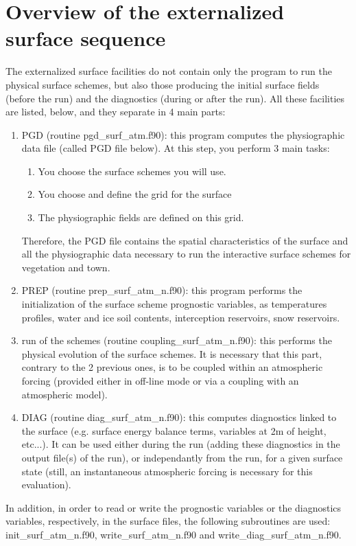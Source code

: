 
\newpage
\section{Overview of the externalized surface sequence}
The externalized surface facilities do not contain only the program to run the physical surface
schemes, but also those producing the initial surface fields (before the run) and the diagnostics
(during or after the run). All these facilities are listed, below, and they separate in 4 main parts:
\begin{enumerate}
	\item PGD (routine pgd\_surf\_atm.f90): this program computes the physiographic data file (called
PGD file below). At this step, you perform 3 main tasks:
		\begin{enumerate}
			\item You choose the surface schemes you will use.
			\item You choose and define the grid for the surface
			\item The physiographic fields are defined on this grid.
		\end{enumerate}
Therefore, the PGD file contains the spatial characteristics of the surface and all the
physiographic data necessary to run the interactive surface schemes for vegetation and
town.
	\item PREP (routine prep\_surf\_atm\_n.f90): this program performs the initialization of the surface
scheme prognostic variables, as temperatures profiles, water and ice soil contents,
interception reservoirs, snow reservoirs.
	\item run of the schemes (routine coupling\_surf\_atm\_n.f90): this performs the physical evolution
of the surface schemes. It is necessary that this part, contrary to the 2 previous ones, is to be
coupled within an atmospheric forcing (provided either in off-line mode or via a coupling
with an atmospheric model).
	\item DIAG (routine diag\_surf\_atm\_n.f90): this computes diagnostics linked to the surface (e.g.
surface energy balance terms, variables at 2m of height, etc...). It can be used either during
the run (adding these diagnostics in the output file(s) of the run), or independantly from the
run, for a given surface state (still, an instantaneous atmospheric forcing is necessary for this
evaluation).
\end{enumerate}
In addition, in order to read or write the prognostic variables or the diagnostics variables,
respectively, in the surface files, the following subroutines are used: init\_surf\_atm\_n.f90,
write\_surf\_atm\_n.f90 and write\_diag\_surf\_atm\_n.f90.

